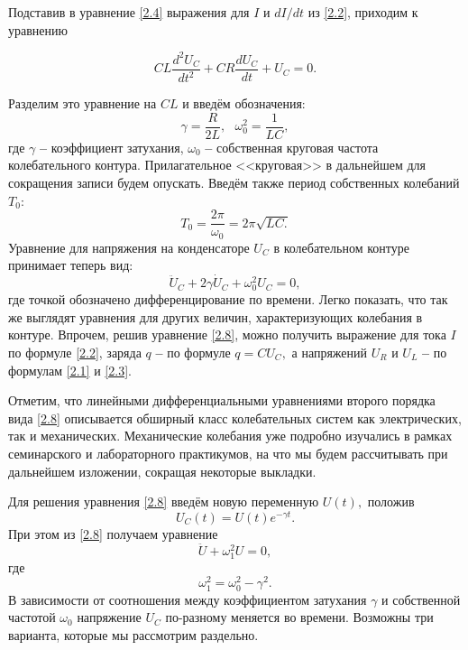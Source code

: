 Подставив в уравнение \eqref{2.4} выражения для $I$ и $dI/dt$ из \eqref{2.2}, приходим к уравнению

\begin{equation}\label{2.5}
CL\dfrac{d^2U_C}{dt^2}+CR\dfrac{dU_C}{dt}+U_C=0.
\end{equation}

Разделим это уравнение на $CL$ и введём обозначения:
\begin{equation}\label{2.6}
\gamma=\dfrac{R}{2L},~~~\omega_0^2=\dfrac{1}{LC},
\end{equation}
где $\gamma$ \textbf{--} \textsf{коэффициент затухания,} $\omega_0$ \textbf{--}  \textsf{собственная круговая частота} колебательного контура. Прилагательное  \textsf{<<круговая>>} в дальнейшем для сокращения записи будем опускать. Введём также  \textsf{период собственных колебаний $T_0$:}
\begin{equation}\label{2.7}
T_0=\dfrac{2\pi}{\omega_0}=2\pi\sqrt{LC.}
\end{equation}
Уравнение для напряжения на конденсаторе $U_C$ в колебательном контуре принимает теперь вид:
\begin{equation}\label{2.8}
\ddot{U}_C+2\gamma\dot{U}_C+\omega_0^2U_C=0,
\end{equation}
где точкой обозначено дифференцирование по времени. Легко показать, что так же выглядят уравнения для других величин, характеризующих колебания в контуре. Впрочем, решив урав\-нение \eqref{2.8}, можно получить выражение для тока $I$ по формуле \eqref{2.2}, заряда $q$ \textbf{--} по формуле $q=CU_C,$ а напряжений $U_R$ и $U_L$ \textbf{--} по формулам \eqref{2.1} и \eqref{2.3}.

Отметим, что линейными дифференциальными уравнениями второго порядка вида \eqref{2.8} описывается обширный класс колебательных систем как электрических, так и механических. Механические колебания уже подробно изучались в рамках семинарского и лабораторного практикумов, на что мы будем рассчитывать при дальнейшем изложении, сокращая некоторые выкладки.

Для решения уравнения \eqref{2.8} введём новую переменную $U(t),$ положив 
\begin{equation}\label{2.9}
U_C(t)=U(t)e^{-\gamma t}.
\end{equation}
При этом из \eqref{2.8} получаем уравнение
\begin{equation}\label{2.10}
\ddot{U}+\omega_1^2U=0,
\end{equation}
где
\begin{equation}\label{2.11}
\omega_1^2=\omega_0^2-\gamma^2.
\end{equation}
В зависимости от соотношения между коэффициентом затухания $\gamma$ и собственной частотой $\omega_0$ напряжение $U_C$ по-разному меняется во времени. Возможны три варианта, которые мы рассмотрим раздельно.

